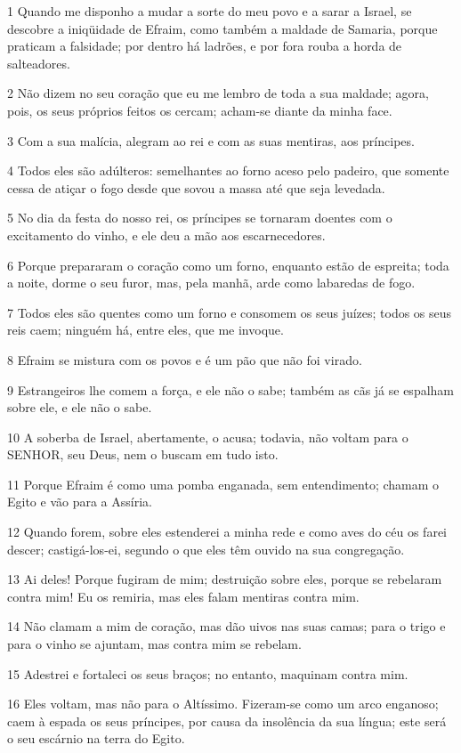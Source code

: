 \par 1 Quando me disponho a mudar a sorte do meu povo e a sarar a Israel, se descobre a iniqüidade de Efraim, como também a maldade de Samaria, porque praticam a falsidade; por dentro há ladrões, e por fora rouba a horda de salteadores.
\par 2 Não dizem no seu coração que eu me lembro de toda a sua maldade; agora, pois, os seus próprios feitos os cercam; acham-se diante da minha face.
\par 3 Com a sua malícia, alegram ao rei e com as suas mentiras, aos príncipes.
\par 4 Todos eles são adúlteros: semelhantes ao forno aceso pelo padeiro, que somente cessa de atiçar o fogo desde que sovou a massa até que seja levedada.
\par 5 No dia da festa do nosso rei, os príncipes se tornaram doentes com o excitamento do vinho, e ele deu a mão aos escarnecedores.
\par 6 Porque prepararam o coração como um forno, enquanto estão de espreita; toda a noite, dorme o seu furor, mas, pela manhã, arde como labaredas de fogo.
\par 7 Todos eles são quentes como um forno e consomem os seus juízes; todos os seus reis caem; ninguém há, entre eles, que me invoque.
\par 8 Efraim se mistura com os povos e é um pão que não foi virado.
\par 9 Estrangeiros lhe comem a força, e ele não o sabe; também as cãs já se espalham sobre ele, e ele não o sabe.
\par 10 A soberba de Israel, abertamente, o acusa; todavia, não voltam para o SENHOR, seu Deus, nem o buscam em tudo isto.
\par 11 Porque Efraim é como uma pomba enganada, sem entendimento; chamam o Egito e vão para a Assíria.
\par 12 Quando forem, sobre eles estenderei a minha rede e como aves do céu os farei descer; castigá-los-ei, segundo o que eles têm ouvido na sua congregação.
\par 13 Ai deles! Porque fugiram de mim; destruição sobre eles, porque se rebelaram contra mim! Eu os remiria, mas eles falam mentiras contra mim.
\par 14 Não clamam a mim de coração, mas dão uivos nas suas camas; para o trigo e para o vinho se ajuntam, mas contra mim se rebelam.
\par 15 Adestrei e fortaleci os seus braços; no entanto, maquinam contra mim.
\par 16 Eles voltam, mas não para o Altíssimo. Fizeram-se como um arco enganoso; caem à espada os seus príncipes, por causa da insolência da sua língua; este será o seu escárnio na terra do Egito.

